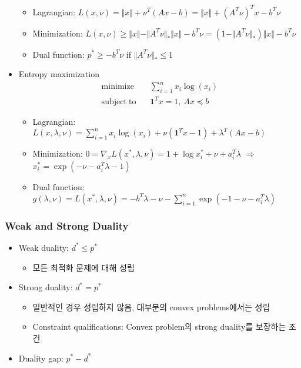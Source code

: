 \begin{itemize}
\begin{itemize}
        \item Lagrangian: $L(x,\nu)=\Vert x\Vert+\nu^T(Ax-b) = \Vert x\Vert + (A^T\nu)^Tx - b^T\nu$
        \item Minimization: $L(x,\nu)\geq\Vert x\Vert -\Vert A^T\nu\Vert_\ast \Vert x\Vert - b^T\nu = (1-\Vert A^T\nu\Vert_\ast)\Vert x\Vert-b^T\nu$
        \item Dual function: $p^\ast\geq-b^T\nu$ if $\Vert A^T\nu\Vert_\ast\leq 1$
    \end{itemize}
    \item Entropy maximization
    \begin{equation}\begin{aligned}
        \mathrm{minimize}~~&~~\sum_{i=1}^n x_i\log(x_i) \\
        \mathrm{subject~to}~~&~~\mathbf{1}^Tx = 1,~Ax\preceq b
    \end{aligned}\end{equation}
    \begin{itemize}
        \item Lagrangian: $L(x,\lambda,\nu)=\sum_{i=1}^nx_i\log(x_i)+\nu(\mathbf{1}^Tx-1)+\lambda^T(Ax-b)$
        \item Minimization: $0 = \nabla_x L(x^\ast,\lambda,\nu)=1+\log x_i^\ast+\nu+a_i^T\lambda$ $\Rightarrow$ $x_i^\ast=\exp(-\nu-a_i^T\lambda - 1)$
        \item Dual function: $g(\lambda,\nu)=L(x^\ast,\lambda,\nu)=-b^T\lambda-\nu-\sum_{i=1}^n\exp(-1-\nu-a_i^T\lambda)$
    \end{itemize}
\end{itemize}
\newpage

\subsubsection*{Weak and Strong Duality}
\begin{itemize}
    \item Weak duality: $d^\ast\leq p^\ast$
    \begin{itemize}
        \item 모든 최적화 문제에 대해 성립
    \end{itemize}
    \item Strong duality: $d^\ast = p^\ast$
    \begin{itemize}
        \item 일반적인 경우 성립하지 않음, 대부분의 convex problems에서는 성립
        \item Constraint qualifications: Convex problem의 strong duality를 보장하는 조건
    \end{itemize}
    \item Duality gap: $p^\ast - d^\ast$
\end{itemize}

